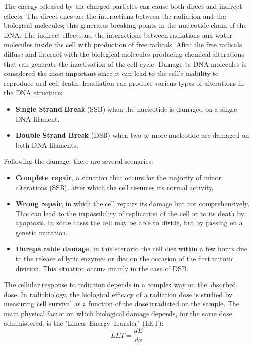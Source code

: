 \noindent The energy released by the charged particles can cause both direct and indirect effects.
The direct ones are the interactions between the radiation and the biological molecules; this generates breaking points in the nucleotide chain of the DNA.
The indirect effects are the interactions between radiations and water molecules inside the cell with production of free radicals.
After the free radicals diffuse and interact with the biological molecules producing chemical alterations that can generate the inactivation of the cell cycle.
Damage to DNA molecules is considered the most important since it can lead to the cell's inability to reproduce and cell death\cite{cells}.
\newline
Irradiation can produce various types of alterations in the DNA structure:
\begin{itemize}
	\item \textbf{Single Strand Break} (SSB) when the nucleotide is damaged on a single DNA filament.
	\item \textbf{Double Strand Break} (DSB) when two or more nucleotide are damaged on both DNA filaments. 
\end{itemize}
Following the damage, there are several scenarios:
\begin{itemize}
	\item \textbf{Complete repair}, a situation that occurs for the majority of minor alterations (SSB), after which the cell resumes its normal activity.
	\item \textbf{Wrong repair}, in which the cell repairs its damage but not comprehensively. This can lead to the impossibility of replication of the cell or to its death by apoptosis. In some cases the cell may be able to divide, but by passing on a genetic mutation.
	\item \textbf{Unrepairable damage}, in this scenario the cell dies within a few hours due to the release of lytic enzymes or dies on the occasion of the first mitotic division. This situation occurs mainly in the case of DSB.
\end{itemize}
The cellular response to radiation depends in a complex way on the absorbed dose. In radiobiology, the biological efficacy of a radiation dose is studied by measuring cell survival as a function of the dose irradiated on the sample. The main physical factor on which biological damage depends, for the same dose administered, is the "Linear Energy Transfer" (LET)\cite{let}:   
\begin{equation}\label{eq:let}
	LET=\frac{dE}{dx}
\end{equation}

